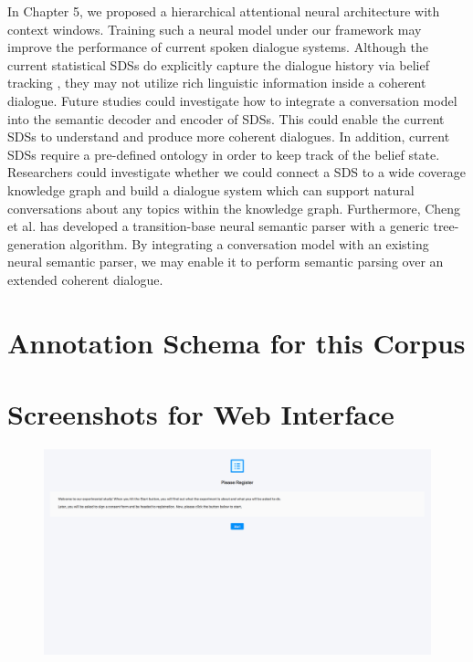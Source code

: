 \documentclass[bsc,frontabs,twoside,singlespacing,parskip,deptreport]{infthesis}     %
\begin{document}
In Chapter 5, we proposed a hierarchical attentional neural architecture with context windows. Training such a neural model under our framework may improve the performance of current spoken dialogue systems. Although the current statistical SDSs do explicitly capture the dialogue history via belief tracking \cite{gasic}, they may not utilize rich linguistic information inside a coherent dialogue. Future studies could investigate how to integrate a conversation model into the semantic decoder and encoder of SDSs. This could enable the current SDSs to understand and produce more coherent dialogues. In addition, current SDSs require a pre-defined ontology in order to keep track of the belief state. Researchers could investigate whether we could connect a SDS to a wide coverage knowledge graph and build a dialogue system which can support natural conversations about any topics within the knowledge graph. Furthermore, Cheng et al.\cite{cheng2019learning} has developed a transition-base neural semantic parser with a generic tree-generation algorithm. By integrating a conversation model with an existing neural semantic parser, we may enable it to perform semantic parsing over an extended coherent dialogue.






\appendix
\chapter{Annotation Schema for this Corpus}
\label{appendix:annotation}


\chapter{Screenshots for Web Interface}
\label{fig:interface}

\begin{figure}[h]
    \centering
    \includegraphics[width=\textwidth]{regi.png}
    
    
    \label{fig:regi}
\end{figure}
\end{document}
